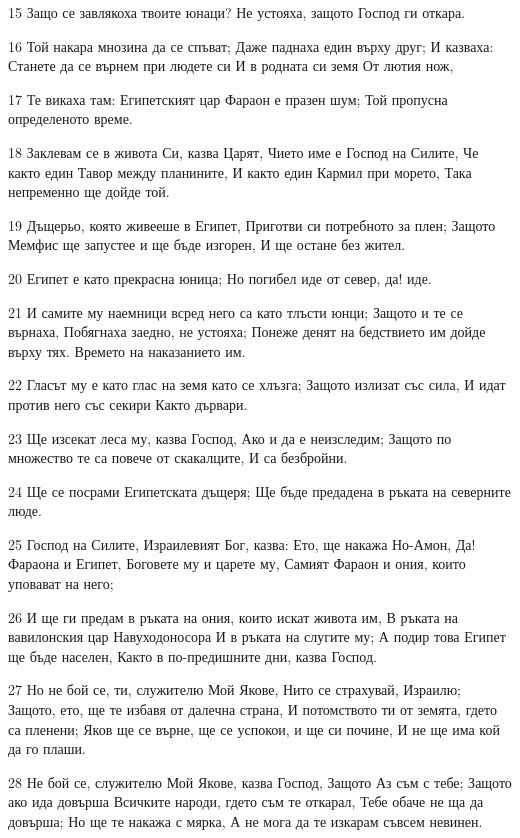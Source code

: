 \par 15 Защо се завлякоха твоите юнаци? Не устояха, защото Господ ги откара.
\par 16 Той накара мнозина да се спъват; Даже паднаха един върху друг; И казваха: Станете да се върнем при людете си И в родната си земя От лютия нож,
\par 17 Те викаха там: Египетският цар Фараон е празен шум; Той пропусна определеното време.
\par 18 Заклевам се в живота Си, казва Царят, Чието име е Господ на Силите, Че както един Тавор между планините, И както един Кармил при морето, Така непременно ще дойде той.
\par 19 Дъщерьо, която живееше в Египет, Приготви си потребното за плен; Защото Мемфис ще запустее и ще бъде изгорен, И ще остане без жител.
\par 20 Египет е като прекрасна юница; Но погибел иде от север, да! иде.
\par 21 И самите му наемници всред него са като тлъсти юнци; Защото и те се върнаха, Побягнаха заедно, не устояха; Понеже денят на бедствието им дойде върху тях. Времето на наказанието им.
\par 22 Гласът му е като глас на земя като се хлъзга; Защото излизат със сила, И идат против него със секири Както дървари.
\par 23 Ще изсекат леса му, казва Господ, Ако и да е неизследим; Защото по множество те са повече от скакалците, И са безбройни.
\par 24 Ще се посрами Египетската дъщеря; Ще бъде предадена в ръката на северните люде.
\par 25 Господ на Силите, Израилевият Бог, казва: Ето, ще накажа Но-Амон, Да! Фараона и Египет, Боговете му и царете му, Самият Фараон и ония, които уповават на него;
\par 26 И ще ги предам в ръката на ония, които искат живота им, В ръката на вавилонския цар Навуходоносора И в ръката на слугите му; А подир това Египет ще бъде населен, Както в по-предишните дни, казва Господ.
\par 27 Но не бой се, ти, служителю Мой Якове, Нито се страхувай, Израилю; Защото, ето, ще те избавя от далечна страна, И потомството ти от земята, гдето са пленени; Яков ще се върне, ще се успокои, и ще си почине, И не ще има кой да го плаши.
\par 28 Не бой се, служителю Мой Якове, казва Господ, Защото Аз съм с тебе; Защото ако ида довърша Всичките народи, гдето съм те откарал, Тебе обаче не ща да довърша; Но ще те накажа с мярка, А не мога да те изкарам съвсем невинен.


